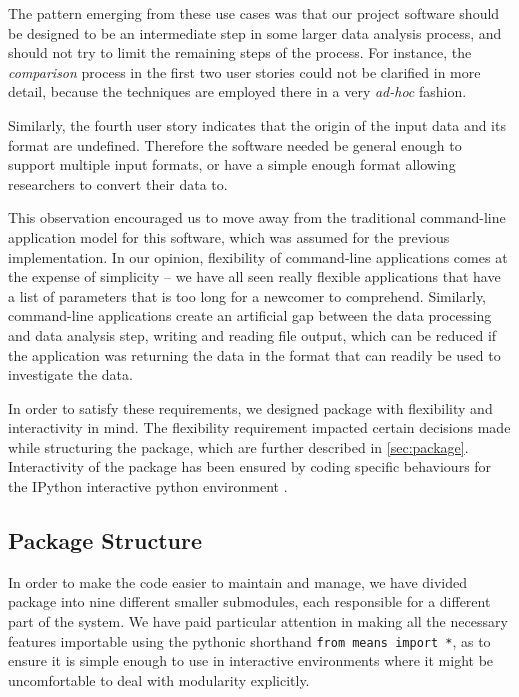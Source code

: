 The pattern emerging from these use cases was that our project software should be designed to be an intermediate step in some larger data analysis process, and should not try to limit the remaining steps of the process.
For instance, the \emph{comparison} process in the first two user stories could not be clarified in more detail, because the techniques are employed there in a very \emph{ad-hoc} fashion.

Similarly, the fourth user story indicates that the origin of the input data and its format are undefined.
Therefore the software needed be general enough to support multiple input formats, or have a simple enough format allowing researchers to convert their data to.

This observation encouraged us to move away from the traditional command-line application model for this software, which was assumed for the previous implementation\cite{babtie_moment_2013}.
In our opinion, flexibility of command-line applications comes at the expense of simplicity -- we have all seen really flexible applications that have a list of parameters that is too long for a newcomer to comprehend.
Similarly, command-line applications create an artificial gap between the data processing and data analysis step, \ie{} writing and reading file output, which can be reduced if the application was returning the data in the format that can readily be used to investigate the data.

In order to satisfy these requirements, we designed \means{} package with flexibility and interactivity in mind. 
The flexibility requirement impacted certain decisions made while structuring the package, which are further described in \autoref{sec:package}.
Interactivity of the package has been ensured by coding specific behaviours for the IPython interactive python environment \cite{perez_ipython:_2007}.

\subsection{Package Structure}
\label{sec:package}

In order to make the code easier to maintain and manage, we have divided \means{} package into nine different smaller submodules, each responsible for a different part of the system.
We have paid particular attention in making all the necessary features importable using the pythonic shorthand \verb"from means import *", 
as to ensure it is simple enough to use \means{} in interactive environments where it might be uncomfortable to deal with modularity explicitly.


